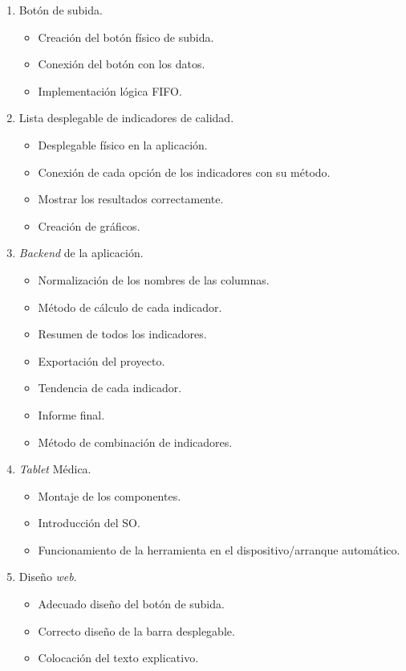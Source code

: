 \begin{enumerate}
	\item Botón de subida.
	\begin{itemize}
		\item Creación del botón físico de subida.
		\item Conexión del botón con los datos.
		\item Implementación lógica FIFO.
	\end{itemize}
	\item Lista desplegable de indicadores de calidad.
	\begin{itemize}
		\item Desplegable físico en la aplicación.
		\item Conexión de cada opción de los indicadores con su método.
		\item Mostrar los resultados correctamente.
		\item Creación de gráficos.
	\end{itemize}
	\item \textit{Backend} de la aplicación.
	\begin{itemize}
		\item Normalización de los nombres de las columnas.
		\item Método de cálculo de cada indicador.
		\item Resumen de todos los indicadores.
		\item Exportación del proyecto.
		\item Tendencia de cada indicador.
		\item Informe final.
		\item Método de combinación de indicadores.
	\end{itemize}
	\item \textit{Tablet} Médica.
	\begin{itemize}
		\item Montaje de los componentes.
		\item Introducción del SO.
		\item Funcionamiento de la herramienta en el dispositivo/arranque automático.
	\end{itemize}
	\item Diseño \textit{web}.
	\begin{itemize}
		\item Adecuado diseño del botón de subida. 
		\item Correcto diseño de la barra desplegable.
		\item Colocación del texto explicativo.

\end{itemize}
\end{enumerate}
